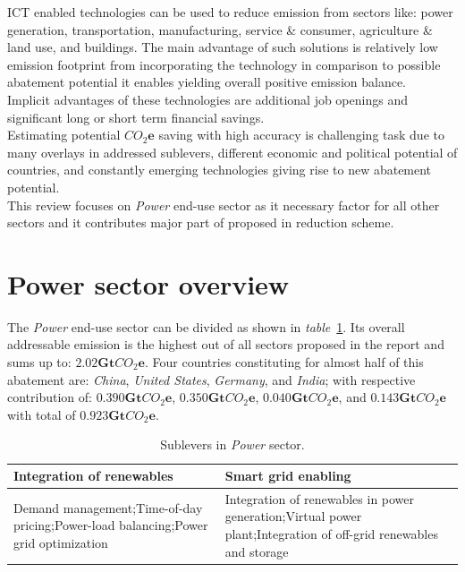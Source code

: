 \documentclass[11pt, twocolumn]{article}
\begin{document}
ICT enabled technologies can be used to reduce emission from sectors like: power generation, transportation, manufacturing, service \& consumer, agriculture \& land use, and buildings. The main advantage of such solutions is relatively low emission footprint from incorporating the technology in comparison to possible abatement potential it enables yielding overall positive emission balance.\\
Implicit advantages of these technologies are additional job openings and significant long or short term financial savings.\\

Estimating potential $CO_2\mathbf{e}$ saving with high accuracy is challenging task due to many overlays in addressed sublevers, different economic and political potential of countries, and constantly emerging technologies giving rise to new abatement potential.\\

This review focuses on \emph{Power} end-use sector as it necessary factor for all other sectors and it contributes major part of proposed in \citep{global2012smarter} reduction scheme.

\section{Power sector overview}
The \emph{Power} end-use sector can be divided as shown in \emph{table}~\ref{tab:powersublevers}. Its overall addressable emission is the highest out of all sectors proposed in the report and sums up to: $\mathbf{2.02} \mathbf{Gt}CO_2\mathbf{e}$. Four countries constituting for almost half of this abatement are: \emph{China}, \emph{United States}, \emph{Germany}, and \emph{India}; with respective contribution of: $\mathbf{0.390} \mathbf{Gt}CO_2\mathbf{e}$, $\mathbf{0.350} \mathbf{Gt}CO_2\mathbf{e}$, $\mathbf{0.040} \mathbf{Gt}CO_2\mathbf{e}$, and $\mathbf{0.143} \mathbf{Gt}CO_2\mathbf{e}$ with total of $\mathbf{0.923} \mathbf{Gt}CO_2\mathbf{e}$.

\begin{center}
  \begin{table}[h]
    \begin{tabular}{ p{} | p{} }%
      Integration of renewables & Smart grid enabling \\
      \hline
      Demand management;\newline Time-of-day pricing;\newline Power-load balancing;\newline Power grid optimization & Integration of renewables in power generation;\newline Virtual power plant;\newline Integration of off-grid renewables and storage
    \end{tabular}
    \caption{Sublevers in \emph{Power} sector.\label{tab:powersublevers}}
  \end{table}
\end{center}
\end{document}
